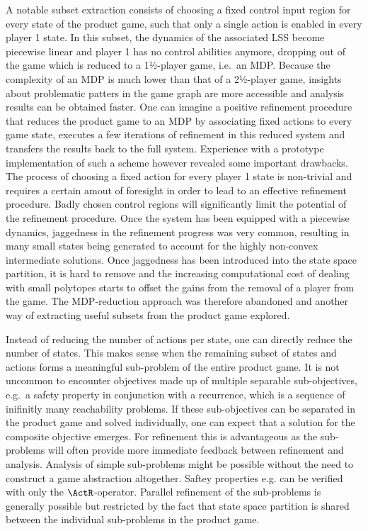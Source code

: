     A notable subset extraction consists of choosing a fixed control input region for every state of the product game, such that only a single action is enabled in every player 1 state.
    In this subset, the dynamics of the associated LSS become piecewise linear and player 1 has no control abilities anymore, dropping out of the game which is reduced to a 1½-player game, i.e.\ an MDP.
    Because the complexity of an MDP is much lower than that of a 2½-player game, insights about problematic patters in the game graph are more accessible and analysis results can be obtained faster.
    One can imagine a positive refinement procedure that reduces the product game to an MDP by associating fixed actions to every game state, executes a few iterations of refinement in this reduced system and transfers the results back to the full system.
    Experience with a prototype implementation of such a scheme however revealed some important drawbacks.
    The process of choosing a fixed action for every player 1 state is non-trivial and requires a certain amout of foresight in order to lead to an effective refinement procedure.
    Badly chosen control regions will significantly limit the potential of the refinement procedure.
    Once the system has been equipped with a piecewise dynamics, jaggedness in the refinement progress was very common, resulting in many small states being generated to account for the highly non-convex intermediate solutions.
    Once jaggedness has been introduced into the state space partition, it is hard to remove and the increasing computational cost of dealing with small polytopes starts to offset the gains from the removal of a player from the game.
    The MDP-reduction approach was therefore abandoned and another way of extracting useful subsets from the product game explored.

    Instead of reducing the number of actions per state, one can directly reduce the number of states.
    This makes sense when the remaining subset of states and actions forms a meaningful sub-problem of the entire product game.
    It is not uncommon to encounter objectives made up of multiple separable sub-objectives, e.g.\ a safety property in conjunction with a recurrence, which is a sequence of inifinitly many reachability problems.
    If these sub-objectives can be separated in the product game and solved individually, one can expect that a solution for the composite objective emerges.
    For refinement this is advantageous as the sub-problems will often provide more immediate feedback between refinement and analysis.
    Analysis of simple sub-problems might be possible without the need to construct a game abstraction altogether.
    Saftey properties e.g. can be verified with only the $\ActR$-operator.
    Parallel refinement of the sub-problems is generally possible but restricted by the fact that state space partition is shared between the individual sub-problems in the product game.

